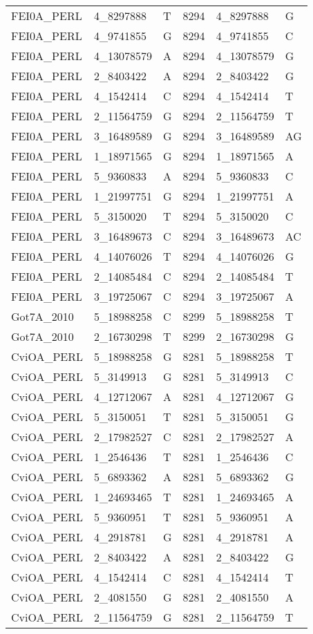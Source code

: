 \begin{center}
\begin{longtable}{|l|l|l|l|l|l|}
FEI0A\_PERL&4\_8297888&T&8294&4\_8297888&G\\
FEI0A\_PERL&4\_9741855&G&8294&4\_9741855&C\\
FEI0A\_PERL&4\_13078579&A&8294&4\_13078579&G\\
FEI0A\_PERL&2\_8403422&A&8294&2\_8403422&G\\
FEI0A\_PERL&4\_1542414&C&8294&4\_1542414&T\\
FEI0A\_PERL&2\_11564759&G&8294&2\_11564759&T\\
FEI0A\_PERL&3\_16489589&G&8294&3\_16489589&AG\\
FEI0A\_PERL&1\_18971565&G&8294&1\_18971565&A\\
FEI0A\_PERL&5\_9360833&A&8294&5\_9360833&C\\
FEI0A\_PERL&1\_21997751&G&8294&1\_21997751&A\\
FEI0A\_PERL&5\_3150020&T&8294&5\_3150020&C\\
FEI0A\_PERL&3\_16489673&C&8294&3\_16489673&AC\\
FEI0A\_PERL&4\_14076026&T&8294&4\_14076026&G\\
FEI0A\_PERL&2\_14085484&C&8294&2\_14085484&T\\
FEI0A\_PERL&3\_19725067&C&8294&3\_19725067&A\\
Got7A\_2010&5\_18988258&C&8299&5\_18988258&T\\
Got7A\_2010&2\_16730298&T&8299&2\_16730298&G\\
CviOA\_PERL&5\_18988258&G&8281&5\_18988258&T\\
CviOA\_PERL&5\_3149913&G&8281&5\_3149913&C\\
CviOA\_PERL&4\_12712067&A&8281&4\_12712067&G\\
CviOA\_PERL&5\_3150051&T&8281&5\_3150051&G\\
CviOA\_PERL&2\_17982527&C&8281&2\_17982527&A\\
CviOA\_PERL&1\_2546436&T&8281&1\_2546436&C\\
CviOA\_PERL&5\_6893362&A&8281&5\_6893362&G\\
CviOA\_PERL&1\_24693465&T&8281&1\_24693465&A\\
CviOA\_PERL&5\_9360951&T&8281&5\_9360951&A\\
CviOA\_PERL&4\_2918781&G&8281&4\_2918781&A\\
CviOA\_PERL&2\_8403422&A&8281&2\_8403422&G\\
CviOA\_PERL&4\_1542414&C&8281&4\_1542414&T\\
CviOA\_PERL&2\_4081550&G&8281&2\_4081550&A\\
CviOA\_PERL&2\_11564759&G&8281&2\_11564759&T\\

\end{longtable}
\end{center}
